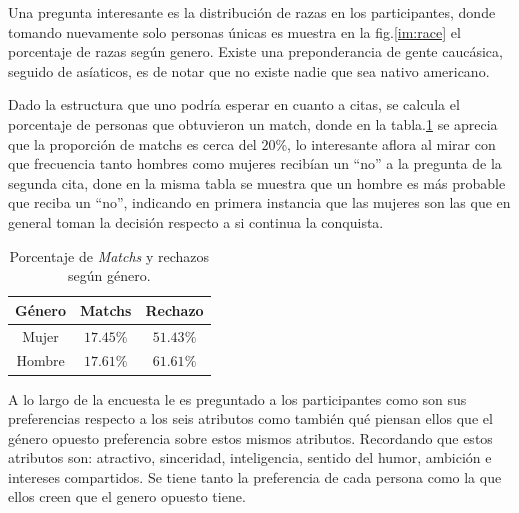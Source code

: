 
Una pregunta interesante es la distribución de razas en los participantes, donde tomando nuevamente solo personas únicas es muestra en la fig.\ref{im:race} el porcentaje de razas según genero. Existe una preponderancia de gente caucásica, seguido de asíaticos, es de notar que no existe nadie que sea nativo americano.


Dado la estructura que uno podría esperar en cuanto a citas, se calcula el porcentaje de personas que obtuvieron un match, donde en la tabla.\ref{tab:prop_matchs} se aprecia que la proporción de matchs es cerca del $20\%$, lo interesante aflora al mirar con que frecuencia tanto hombres como mujeres recibían un ``no'' a la pregunta de la segunda cita, done en la misma tabla se muestra que un hombre es más probable que reciba un ``no'', indicando en primera instancia que las mujeres son las que en general toman la decisión respecto a si continua la conquista.

\begin{table}[h!]
\centering
\begin{tabular}{c c c}
\toprule
Género & Matchs & Rechazo\\ 
\midrule
Mujer & $17.45\%$ & $51.43\%$ \\ 
Hombre & $17.61\%$ & $61.61\%$ \\
\bottomrule
\end{tabular}
\caption{Porcentaje de \textit{Matchs}  y rechazos según género.}
\label{tab:prop_matchs}
\end{table}

A lo largo de la encuesta le es preguntado a los participantes como son sus preferencias respecto a los seis atributos como también qué piensan ellos que el género opuesto preferencia sobre estos mismos atributos. Recordando que estos atributos son: atractivo, sinceridad, inteligencia, sentido del humor, ambición e intereses compartidos. Se tiene tanto la preferencia de cada persona como la que ellos creen que el genero opuesto tiene.

